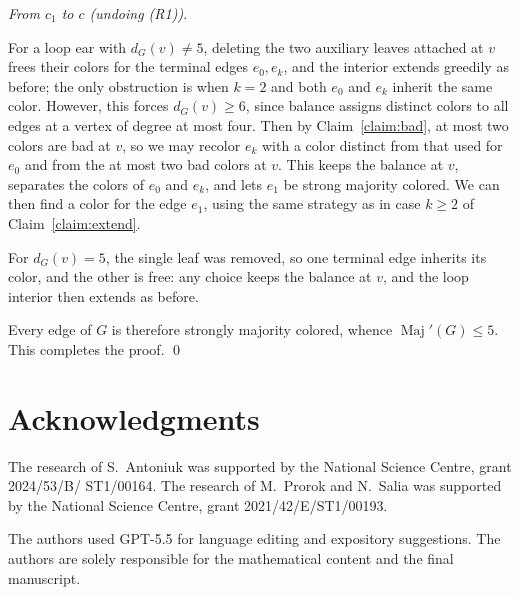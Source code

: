 \documentclass[11pt]{article}
\theoremstyle{definition}
\DeclareMathOperator{\Maj}{Maj}
\newcommand{\Majp}{\Maj'}
\begin{document}
\smallskip
\emph{From $c_1$ to $c$ (undoing (R1)).}
\smallskip

For a loop ear with $d_G(v)\neq 5$, deleting the two auxiliary leaves attached at $v$ frees their colors for the terminal edges $e_0,e_k$, and the interior extends greedily as before; the only obstruction is when $k=2$ and both $e_0$ and $e_k$ inherit the same color. However, this forces $d_G(v)\ge 6$, since balance assigns distinct colors to all edges at a vertex of degree at most four. Then by Claim~\ref{claim:bad}, at most two colors are bad at $v$, so we may recolor $e_k$ with a color distinct from that used for $e_0$ and from the at most two bad colors at $v$. This keeps the balance at $v$, separates the colors of $e_0$ and $e_k$, and lets $e_1$ be strong majority colored. We can then find a color for the edge $e_1$, using the same strategy as in case $k\geq 2$ of Claim~\ref{claim:extend}. 

For $d_G(v)=5$, the single leaf was removed, so one terminal edge inherits its color, and the other is free: any choice keeps the balance at $v$, and the loop interior then extends as before.

Every edge of $G$ is therefore strongly majority colored, whence $\Majp(G)\le 5$. This completes the proof. \qed






\section*{Acknowledgments}
The research of S.~Antoniuk was supported by the National Science Centre, grant 2024/53/B/ ST1/00164.
The research of M.~Prorok and N.~Salia was supported by the National Science Centre, grant 2021/42/E/ST1/00193.

The authors used GPT-5.5 for language editing and expository
suggestions. The authors are solely responsible for the mathematical content and the
final manuscript.



\end{document}
